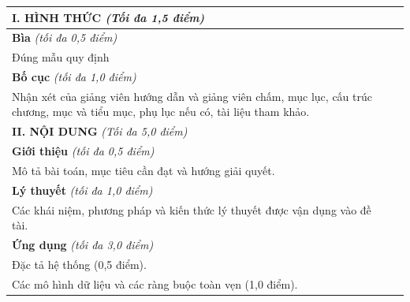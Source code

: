 \documentclass[12pt,a4paper,oneside]{report}
\begin{document}
{  \vspace{2pt}
  \begin{tabularx}{\textwidth}{@{}>{\raggedright\arraybackslash}X|p{1.15cm}@{}}
    \hline
    \textbf{I. HÌNH THỨC} \textit{(Tối đa 1,5 điểm)}                                                                                           & \\
    \hline
    \textbf{Bìa} \textit{(tối đa 0,5 điểm)}                                                                                                    & \\
    \quad Đúng mẫu quy định                                                                                                                    & \\
    \hline
    \textbf{Bố cục} \textit{(tối đa 1,0 điểm)}                                                                                                 & \\
    \quad Nhận xét của giảng viên hướng dẫn và giảng viên chấm, mục lục, cấu trúc chương, mục và tiểu mục, phụ lục nếu có, tài liệu tham khảo. & \\
    \hline
    \textbf{II. NỘI DUNG} \textit{(Tối đa 5,0 điểm)}                                                                                           & \\
    \hline
    \textbf{Giới thiệu} \textit{(tối đa 0,5 điểm)}                                                                                             & \\
    \quad Mô tả bài toán, mục tiêu cần đạt và hướng giải quyết.                                                                                & \\
    \hline
    \textbf{Lý thuyết} \textit{(tối đa 1,0 điểm)}                                                                                              & \\
    \quad Các khái niệm, phương pháp và kiến thức lý thuyết được vận dụng vào đề tài.                                                          & \\
    \hline
    \textbf{Ứng dụng} \textit{(tối đa 3,0 điểm)}                                                                                               & \\
    \quad Đặc tả hệ thống (0,5 điểm).                                                                                                          & \\
    \quad Các mô hình dữ liệu và các ràng buộc toàn vẹn (1,0 điểm).                                                                            & \\

\end{tabularx}}
\end{document}
